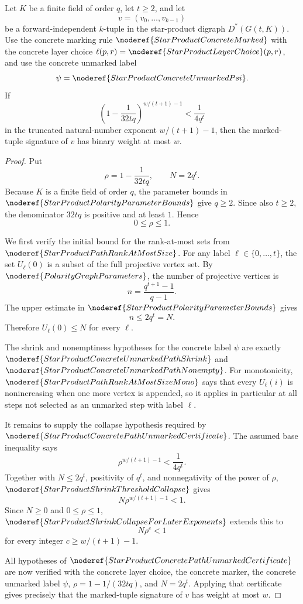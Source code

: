 \begin{helper}
Let \(K\) be a finite field of order \(q\), let \(t\ge2\), and let
\[
  v=(v_0,\ldots,v_{k-1})
\]
be a forward-independent \(k\)-tuple in the star-product digraph
\(D^*(G(t,K))\).  Use the concrete marking rule
\(\noderef{StarProductConcreteMarked}\) with the concrete layer choice
\(\ell(p,r)=\noderef{StarProductLayerChoice}(p,r)\), and use the concrete
unmarked label
\[
  \psi=\noderef{StarProductConcreteUnmarkedPsi}.
\]
If
\[
  \left(1-\frac{1}{32tq}\right)^{w/(t+1)-1}
  <\frac{1}{4q^t}
\]
in the truncated natural-number exponent \(w/(t+1)-1\), then the marked-tuple
signature of \(v\) has binary weight at most \(w\).
\end{helper}
\begin{proof}
Put
\[
  \rho=1-\frac{1}{32tq},\qquad N=2q^t.
\]
Because \(K\) is a finite field of order \(q\), the parameter bounds in
\(\noderef{StarProductPolarityParameterBounds}\) give \(q\ge2\).  Since also
\(t\ge2\), the denominator \(32tq\) is positive and at least \(1\).  Hence
\[
  0\le \rho\le 1.
\]

We first verify the initial bound for the rank-at-most sets from
\(\noderef{StarProductPathRankAtMostSize}\).  For any label
\(\ell\in\{0,\ldots,t\}\), the set \(U_\ell(0)\) is a subset of the full
projective vertex set.  By \(\noderef{PolarityGraphParameters}\), the number
of projective vertices is
\[
  n=\frac{q^{t+1}-1}{q-1}.
\]
The upper estimate in \(\noderef{StarProductPolarityParameterBounds}\) gives
\[
  n\le 2q^t=N.
\]
Therefore \(U_\ell(0)\le N\) for every \(\ell\).

The shrink and nonemptiness hypotheses for the concrete label \(\psi\) are
exactly \(\noderef{StarProductConcreteUnmarkedPathShrink}\) and
\(\noderef{StarProductConcreteUnmarkedPathNonempty}\).  For monotonicity,
\(\noderef{StarProductPathRankAtMostSizeMono}\) says that every
\(U_\ell(i)\) is nonincreasing when one more vertex is appended, so it
applies in particular at all steps not selected as an unmarked step with
label \(\ell\).

It remains to supply the collapse hypothesis required by
\(\noderef{StarProductConcretePathUnmarkedCertificate}\).  The assumed base
inequality says
\[
  \rho^{w/(t+1)-1}<\frac{1}{4q^t}.
\]
Together with \(N\le2q^t\), positivity of \(q^t\), and nonnegativity of the
power of \(\rho\), \(\noderef{StarProductShrinkThresholdCollapse}\) gives
\[
  N\rho^{w/(t+1)-1}<1.
\]
Since \(N\ge0\) and \(0\le\rho\le1\),
\(\noderef{StarProductShrinkCollapseForLaterExponents}\) extends this to
\[
  N\rho^c<1
\]
for every integer \(c\ge w/(t+1)-1\).

All hypotheses of \(\noderef{StarProductConcretePathUnmarkedCertificate}\)
are now verified with the concrete layer choice, the concrete marker, the
concrete unmarked label \(\psi\), \(\rho=1-1/(32tq)\), and \(N=2q^t\).
Applying that certificate gives precisely that the marked-tuple signature of
\(v\) has weight at most \(w\).
\end{proof}
